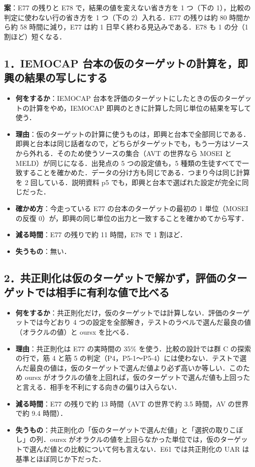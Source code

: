 \begin{tcolorbox}
\textbf{案}：E77 の残りと E78 で，結果の値を変えない省き方を 1 つ（下の 1），比較の判定に使わない行の省き方を 1 つ（下の 2）入れる．E77 の残りは約 80 時間から約 58 時間に減り，E77 は約 1 日早く終わる見込みである．E78 も 1 の分（1 割ほど）短くなる．
\end{tcolorbox}

\subsection{1．IEMOCAP 台本の仮のターゲットの計算を，即興の結果の写しにする}

\begin{itemize}
\item \textbf{何をするか}：IEMOCAP 台本を評価のターゲットにしたときの仮のターゲットの計算をやめ，IEMOCAP 即興のときに計算した同じ単位の結果を写して使う．
\item \textbf{理由}：仮のターゲットの計算に使うものは，即興と台本で全部同じである．即興と台本は同じ話者なので，どちらがターゲットでも，もう一方はソースから外れる．そのため使うソースの集合（AVT の世界なら MOSEI と MELD）が同じになる．出発点の 5 つの設定値も，5 種類の生徒すべてで一致することを確かめた．データの分け方も同じである．つまり今は同じ計算を 2 回している．説明資料 p5 でも，即興と台本で選ばれた設定が完全に同じだった．
\item \textbf{確かめ方}：今走っている E77 の台本のターゲットの最初の 1 単位（MOSEI の反復 0）が，即興の同じ単位の出力と一致することを確かめてから写す．
\item \textbf{減る時間}：E77 の残りで約 11 時間，E78 で 1 割ほど．
\item \textbf{失うもの}：無い．
\end{itemize}

\subsection{2．共正則化は仮のターゲットで解かず，評価のターゲットでは相手に有利な値で比べる}

\begin{itemize}
\item \textbf{何をするか}：共正則化だけ，仮のターゲットでは計算しない．評価のターゲットでは今どおり 4 つの設定を全部解き，テストのラベルで選んだ最良の値（オラクルの値）と oursx を比べる．
\item \textbf{理由}：共正則化は E77 の実時間の 35\% を使う．比較の設計では群 C の探索の行で，筋 4 と筋 5 の判定（P4，P5-1〜P5-4）には使わない．テストで選んだ最良の値は，仮のターゲットで選んだ値より必ず高いか等しい．このため oursx がオラクルの値を上回れば，仮のターゲットで選んだ値も上回ったと言える．相手を不利にする向きの偏りは入らない．
\item \textbf{減る時間}：E77 の残りで約 13 時間（AVT の世界で約 3.5 時間，AV の世界で約 9.4 時間）．
\item \textbf{失うもの}：共正則化の「仮のターゲットで選んだ値」と「選択の取りこぼし」の列．oursx がオラクルの値を上回らなかった単位では，仮のターゲットで選んだ値との比較について何も言えない．E61 では共正則化の UAR は基準とほぼ同じか下だった．
\end{itemize}

